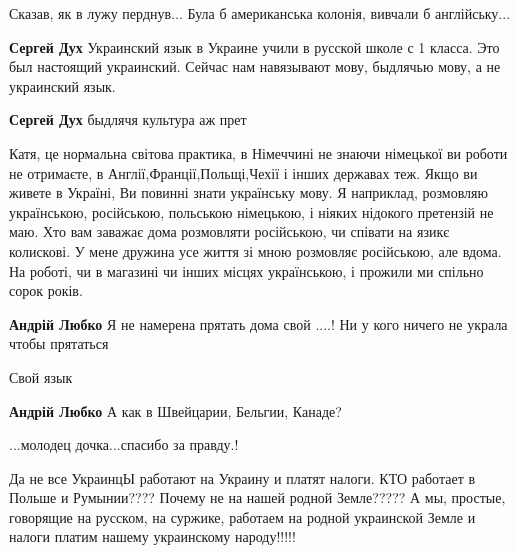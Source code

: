 \begin{itemize}
\begin{itemize}
Сказав, як в лужу перднув... Була б американська колонія, вивчали б англійську...



\textbf{Сергей Дух} Украинский язык в Украине учили в русской школе с 1 класса.
Это был настоящий украинский. Сейчас нам навязывают мову, быдлячью мову, а не
украинский язык.

\textbf{Сергей Дух} быдлячя культура аж прет
\end{itemize}


Катя, це нормальна світова практика, в Німеччині не знаючи німецької ви роботи
не отримаєте, в Англії,Франції,Польщі,Чехії і інших державах теж. Якщо ви
живете в Україні, Ви повинні знати українську мову. Я наприклад, розмовляю
українською, російською, польською німецькою, і ніяких нідокого претензій не
маю. Хто вам заважає дома розмовляти російською, чи співати на язикє колискові.
У мене дружина усе життя зі мною розмовляє російською, але вдома. На роботі, чи
в магазині чи інших місцях українською, і прожили ми спільно сорок років.

\begin{itemize}
\textbf{Андрій Любко} Я не намерена прятать дома свой ....! Ни у кого ничего не украла чтобы прятаться

Свой язык

\textbf{Андрій Любко} А как в Швейцарии, Бельгии, Канаде?
\end{itemize}


...молодец дочка...спасибо за правду.!


Да не все УкраинцЫ работают на Украину и платят налоги. КТО работает в Польше и
Румынии???? Почему не на нашей родной Земле????? А мы, простые, говорящие на
русском, на суржике, работаем на родной украинской Земле и налоги платим нашему
украинскому народу!!!!!




\end{itemize}
